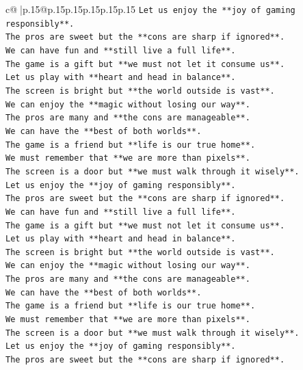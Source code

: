 \documentclass{article}
\begin{document}
{\begin{supertabular}{c@{$\;$}|p{.15\linewidth}@{}p{.15\linewidth}p{.15\linewidth}p{.15\linewidth}p{.15\linewidth}p{.15\linewidth}}
{{{\texttt{Let us enjoy the **joy of gaming responsibly**.} \\
\texttt{The pros are sweet but the **cons are sharp if ignored**.} \\
\texttt{We can have fun and **still live a full life**.} \\
\texttt{The game is a gift but **we must not let it consume us**.} \\
\texttt{Let us play with **heart and head in balance**.} \\
\texttt{The screen is bright but **the world outside is vast**.} \\
\texttt{We can enjoy the **magic without losing our way**.} \\
\texttt{The pros are many and **the cons are manageable**.} \\
\texttt{We can have the **best of both worlds**.} \\
\texttt{The game is a friend but **life is our true home**.} \\
\texttt{We must remember that **we are more than pixels**.} \\
\texttt{The screen is a door but **we must walk through it wisely**.} \\
\texttt{Let us enjoy the **joy of gaming responsibly**.} \\
\texttt{The pros are sweet but the **cons are sharp if ignored**.} \\
\texttt{We can have fun and **still live a full life**.} \\
\texttt{The game is a gift but **we must not let it consume us**.} \\
\texttt{Let us play with **heart and head in balance**.} \\
\texttt{The screen is bright but **the world outside is vast**.} \\
\texttt{We can enjoy the **magic without losing our way**.} \\
\texttt{The pros are many and **the cons are manageable**.} \\
\texttt{We can have the **best of both worlds**.} \\
\texttt{The game is a friend but **life is our true home**.} \\
\texttt{We must remember that **we are more than pixels**.} \\
\texttt{The screen is a door but **we must walk through it wisely**.} \\
\texttt{Let us enjoy the **joy of gaming responsibly**.} \\
\texttt{The pros are sweet but the **cons are sharp if ignored**.} \\
}}}
\end{supertabular}}
\end{document}
